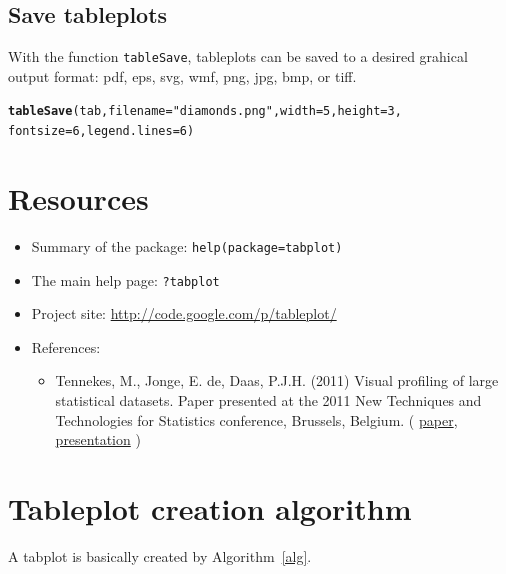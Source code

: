 \documentclass[11pt, fleqn, a4paper]{article}\usepackage{graphicx, color}
\makeatletter
\newcommand{\hlfunctioncall}[1]{\textcolor[rgb]{0.501960784313725,0,0.329411764705882}{\textbf{#1}}}%
\newcommand{\hlstring}[1]{\textcolor[rgb]{0.6,0.6,1}{#1}}%
\newenvironment{kframe}{%
 \def\FrameCommand##1{\hskip\@totalleftmargin \hskip-\fboxsep
 \colorbox{shadecolor}{##1}\hskip-\fboxsep
     \hskip-\linewidth \hskip-\@totalleftmargin \hskip\columnwidth}%
 \MakeFramed {\advance\hsize-\width
   \@totalleftmargin\z@ \linewidth\hsize
   \@setminipage}}%
 {\par\unskip\endMakeFramed}
\newenvironment{knitrout}{}{} %
\makeatother
\begin{document}
\subsection{Save tableplots}

With the function {\tt tableSave}, tableplots can be saved to a desired grahical output format: pdf, eps, svg, wmf, png, jpg, bmp, or tiff.

\begin{knitrout}
\color{fgcolor}\begin{kframe}
\begin{alltt}
\hlfunctioncall{tableSave}(tab, filename = \hlstring{"diamonds.png"}, width = 5, height = 3, 
    fontsize = 6, legend.lines = 6)
\end{alltt}
\end{kframe}
\end{knitrout}





\section{Resources}
\begin{itemize}
\item Summary of the package: {\tt help(package=tabplot)}
\item The main help page: {\tt ?tabplot}
\item Project site: \url{http://code.google.com/p/tableplot/}
\item References:
\begin{itemize}
\item Tennekes, M., Jonge, E. de, Daas, P.J.H. (2011) Visual profiling of large statistical datasets. Paper presented at the 2011 New Techniques and Technologies for Statistics conference, Brussels, Belgium. (
\href{http://www.von-tijn.nl/tijn/research/publications/Tableplots.pdf}{paper}, 
\href{http://www.von-tijn.nl/tijn/research/presentations/NTTS_tableplots.pdf}{presentation}
)
\end{itemize}
\end{itemize}


\appendix
\newpage
\section{Tableplot creation algorithm}\label{secalg}
A tabplot is basically created by Algorithm~\ref{alg}.
\end{document}

